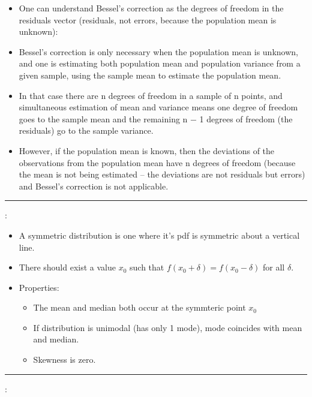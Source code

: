 \documentclass[	DIV=calc,%
paper=a4,%
fontsize=11pt,%
twocolumn]{scrartcl} %
\newcommand{\hformbar}[1]{\vspace{5pt}\hrule\vspace{10pt}} %
\newcommand{\formdesc}[1]{\noindent\textbf{#1}}
\begin{document}
\begin{itemize}
	\item One can understand Bessel's correction as the degrees of freedom in the residuals vector (residuals, not errors, because the population mean is unknown): 
	\item Bessel's correction is only necessary when the population mean is unknown, and one is estimating both population mean and population variance from a given sample, using the sample mean to estimate the population mean.
	\item In that case there are n degrees of freedom in a sample of n points, and simultaneous estimation of mean and variance means one degree of freedom goes to the sample mean and the remaining n − 1 degrees of freedom (the residuals) go to the sample variance. 
	\item However, if the population mean is known, then the deviations of the observations from the population mean have n degrees of freedom (because the mean is not being estimated – the deviations are not residuals but errors) and Bessel's correction is not applicable.
\end{itemize}


\hformbar

\formdesc{Symmetric distribution}:
\begin{itemize}
	\item A symmetric distribution is one where it's pdf is symmetric about a vertical line. 
	\item There should exist a value $x_0$ such that $f(x_0+\delta) = f(x_0-\delta)$ for all $\delta$.
	\item Properties:
		\begin{itemize}
			\item The mean and median both occur at the symmteric point $x_0$
			\item If distribution is unimodal (has only 1 mode), mode coincides with mean and median.
			\item Skewness is zero.
		\end{itemize}
\end{itemize}

\hformbar

\formdesc{Mean, Median, Mode from PDF point of view}:
\end{document}
